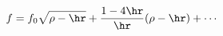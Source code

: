 \begin{equation}
\label{fsim}
  f = f_0 \sqrt{\rho-\hr} + \frac{1-4\hr}{\hr} (\rho-\hr) +\cdots
\end{equation}

